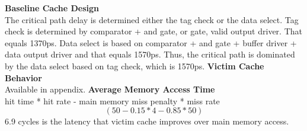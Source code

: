 \documentclass[11pt]{article}
\begin{document}
\begin{Parts}
	\Part \textbf{Baseline Cache Design} \\
	The critical path delay is determined either the tag check or the data select. Tag check is determined by comparator + and gate, or gate, valid output driver. That equals 1370ps. Data select is based on comparator + and gate + buffer driver + data output driver and that equals 1570ps. Thus, the critical path is dominated by the data select based on tag check, which is 1570ps.
	\Part \textbf{Victim Cache Behavior} \\
	Available in appendix.
	\Part \textbf{Average Memory Access Time} \\
	hit time * hit rate - main memory miss penalty * miss rate
	$$(50 - 0.15 * 4 - 0.85 * 50)$$
	6.9 cycles is the latency that victim cache improves over main memory access.
\end{Parts}
\newpage
\end{document}
